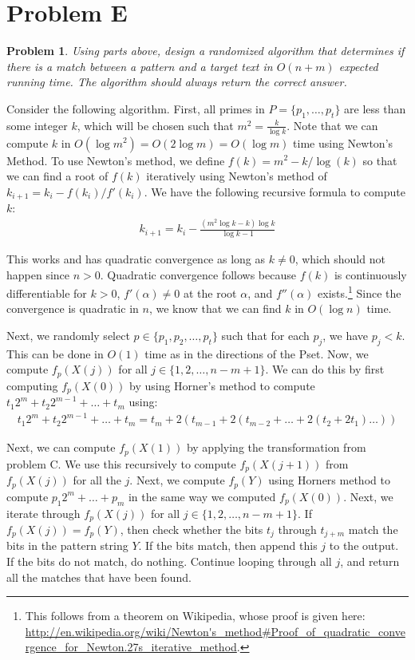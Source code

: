 \documentclass[psamsfonts]{amsart}
\newtheorem{prob}{Problem}[section]
\newenvironment{sol}{{\bfseries Solution}}{\qedsymbol}
\theoremstyle{definition}
\theoremstyle{remark}
\numberwithin{equation}{section}
\begin{document}
\section{Problem E}

\begin{prob}
Using parts above, design a randomized algorithm that determines if there is a match between a pattern and a target text in $O(n +m)$ expected running time. The algorithm should always return the correct answer.
\end{prob}

\begin{sol}
Consider the following algorithm. First, all primes in $P = \{p_1, \ldots, p_t \}$ are less than some integer $k$, which will be chosen such that $m^2 = \frac{k}{\log k}$. Note that we can compute $k$ in $O(\log m^2) = O(2 \log m) = O(\log m)$ time using Newton's Method. To use Newton's method, we define $f(k) = m^2 - k/\log(k)$ so that we can find a root of $f(k)$ iteratively using Newton's method of $k_{i+1} = k_{i} - f(k_i)/f'(k_i)$. We have the following recursive formula to compute $k$:
\begin{eqnarray}
k_{i+1} = k_i - \frac{(m^2 \log k - k) \log k}{\log k - 1}
\end{eqnarray}

This works and has quadratic convergence as long as $k \neq 0$, which should not happen since $n > 0$. Quadratic convergence follows because $f(k)$ is continuously differentiable for $k > 0$, $f'(\alpha) \neq 0$ at the root $\alpha$, and $f''(\alpha)$ exists.\footnote{This follows from a theorem on Wikipedia, whose proof is given here: \url{http://en.wikipedia.org/wiki/Newton's_method\#Proof\_of\_quadratic\_convergence\_for\_Newton.27s\_iterative_method}.} Since the convergence is quadratic in $n$, we know that we can find $k$ in $O(\log n)$ time. 

Next, we randomly select $p \in \{p_1, p_2, \ldots, p_t \}$ such that for each $p_j$, we have $p_j < k$. This can be done in $O(1)$ time as in the directions of the Pset. Now, we compute $f_p(X(j))$ for all $j \in \{1,2,\ldots,n-m+1\}$. We can do this by first computing $f_p(X(0))$ by using Horner's method to compute $t_1 2^{m} + t_2 2^{m-1} + \ldots + t_m$ using:
\begin{eqnarray}
t_1 2^{m} + t_2 2^{m-1} + \ldots + t_m = t_m + 2(t_{m-1} + 2(t_{m-2} + \ldots + 2(t_{2} + 2 t_1) \ldots ) ) 
\end{eqnarray}

Next, we can compute $f_p(X(1))$ by applying the transformation from problem C. We use this recursively to compute $f_p(X(j+1))$ from $f_p(X(j))$ for all the $j$. Next, we compute $f_p(Y)$ using Horners method to compute $p_1 2^{m} + \ldots + p_m$ in the same way we computed $f_p(X(0))$. Next, we iterate through $f_p(X(j))$ for all $j \in \{1,2,\ldots,n-m+1\}$. If $f_p(X(j)) = f_p(Y)$, then check whether the bits $t_{j}$ through $t_{j+m}$ match the bits in the pattern string $Y$. If the bits match, then append this $j$ to the output. If the bits do not match, do nothing. Continue looping through all $j$, and return all the matches that have been found.


\end{sol}
\end{document}
